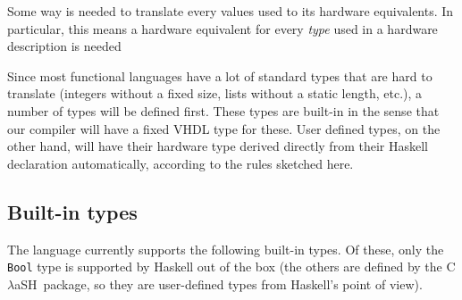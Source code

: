 \documentclass[conference]{IEEEtran}
\def\CLaSH{C$\lambda$aSH}
\def\hs#1{\texttt{#1}}
\begin{document}
    Some way is needed to translate every values used to its hardware
    equivalents. In particular, this means a hardware equivalent for
    every \emph{type} used in a hardware description is needed

    Since most functional languages have a lot of standard types that
    are hard to translate (integers without a fixed size, lists without
    a static length, etc.), a number of  types will be
    defined first. These types are built-in in the sense that our
    compiler will have a fixed VHDL type for these. User defined types,
    on the other hand, will have their hardware type derived directly
    from their Haskell declaration automatically, according to the rules
    sketched here.

  \subsection{Built-in types}
    The language currently supports the following built-in types. Of these,
    only the \hs{Bool} type is supported by Haskell out of the box (the
    others are defined by the \CLaSH\ package, so they are user-defined types
    from Haskell's point of view).
\end{document}
